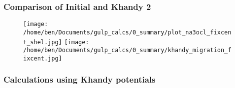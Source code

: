 \documentclass{beamer}
\begin{document}
\begin{frame}
\frametitle{Comparison of Initial and Khandy 2}

\begin{figure}
\texttt{[image: /home/ben/Documents/gulp\_calcs/0\_summary/plot\_na3ocl\_fixcent\_shel.jpg]}%
\texttt{[image: /home/ben/Documents/gulp\_calcs/0\_summary/khandy\_migration\_fixcent.jpg]}
\end{figure}

\end{frame}

\begin{frame}
\frametitle{Calculations using Khandy potentials}



\end{frame}
\end{document}
